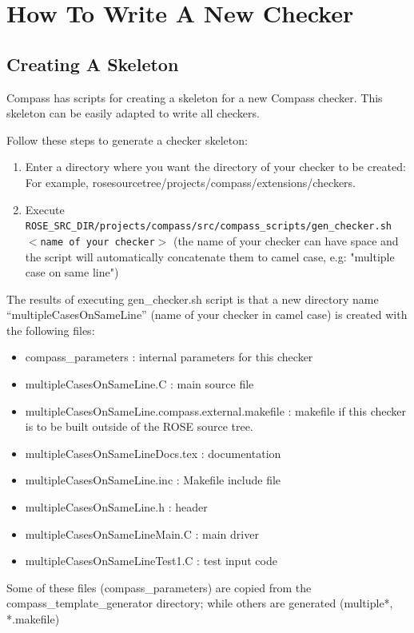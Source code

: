 \section{How To Write A New Checker}

\subsection{Creating A Skeleton}

Compass has scripts for creating a skeleton for a new Compass
checker. This skeleton can be easily adapted to write all checkers.

Follow these steps to generate a checker skeleton:
\begin{enumerate}
   \item Enter a directory where you want the directory of your checker to
   be created: For example,
   rosesourcetree/projects/compass/extensions/checkers.
   \item Execute {\tt
   ROSE\_SRC\_DIR/projects/compass/src/compass\_scripts/gen\_checker.sh
   $<$name of your checker$>$} (the name of your checker can have space and
   the script will automatically concatenate them to camel case, e.g: 
   "multiple case on same line")
\end{enumerate}

The results of executing gen\_checker.sh script is that a new directory name 
``multipleCasesOnSameLine''
(name of your checker in camel case) is created with the following files:
\begin{itemize}
\item compass\_parameters : internal parameters for this checker 
\item multipleCasesOnSameLine.C : main source file 
\item multipleCasesOnSameLine.compass.external.makefile : makefile if this
checker is to be built outside of the ROSE source tree.
\item multipleCasesOnSameLineDocs.tex : documentation 
\item multipleCasesOnSameLine.inc : Makefile include file
\item multipleCasesOnSameLine.h : header
\item multipleCasesOnSameLineMain.C : main driver
\item multipleCasesOnSameLineTest1.C : test input code
\end{itemize}

Some of these files (compass\_parameters)
are copied from the compass\_template\_generator directory; while others are
generated (multiple*, *.makefile)

